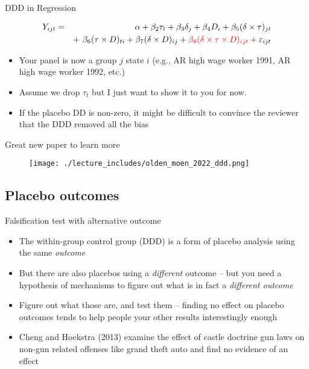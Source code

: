 \documentclass{beamer}
\begin{document}
\begin{frame}{DDD in Regression}
	
	\begin{eqnarray*}
	Y_{ijt} &=&\alpha +  \beta_2 \tau_t + \beta_3 \delta_j  + \beta_4 D_i + \beta_5(\delta \times \tau)_{jt} \\
	&& +\ \beta_6(\tau \times D)_{ti} +  \beta_7(\delta \times D)_{ij} +  \textcolor{red}{\beta_8(\delta \times \tau \times  D)_{ijt}}+  \varepsilon_{ijt}
	\end{eqnarray*}
	
	\begin{itemize}
	\item Your panel is now a group $j$ state $i$ (e.g., AR high wage worker 1991, AR high wage worker 1992, etc.)
	\item Assume we drop $\tau_t$ but I just want to show it to you for now.
	\item If the placebo DD is non-zero, it might be difficult to convince the reviewer that the DDD removed all the bias 
	\end{itemize}
	
\end{frame}

\begin{frame}{Great new paper to learn more}

\begin{figure}
\texttt{[image: ./lecture\_includes/olden\_moen\_2022\_ddd.png]}
\end{figure}

\end{frame}



\subsection{Placebo outcomes}

\begin{frame}{Falsification test with alternative outcome}
	
	\begin{itemize}
	\item The within-group control group (DDD) is a form of placebo analysis using the same \emph{outcome}
	\item But there are also placebos using a \emph{different} outcome -- but you need a hypothesis of mechanisms to figure out what is in fact a \emph{different outcome}
	\item Figure out what those are, and test them -- finding no effect on placebo outcomes tends to help people your other results interestingly enough
	\item Cheng and Hoekstra (2013) examine the effect of castle doctrine gun laws on non-gun related offenses like grand theft auto and find no evidence of an effect 
	\end{itemize}
\end{frame}
\end{document}
